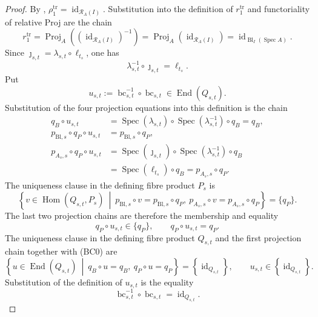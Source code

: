 \begin{proof}
  By ,
  $\rho_1^{\mathrm{tr}}=\operatorname{id}_{\mathcal R_A(I)}$.
  Substitution into the definition of $r_1^{\mathrm{tr}}$ and functoriality
  of relative Proj are the chain
  \[
    r_1^{\mathrm{tr}}
      =\operatorname{Proj}_A
        ((\operatorname{id}_{\mathcal R_A(I)})^{-1})
      =\operatorname{Proj}_A
        (\operatorname{id}_{\mathcal R_A(I)})
      =\operatorname{id}_{\operatorname{Bl}_I(\operatorname{Spec}A)}.
  \]
  Since $\jmath_{s,t}=\lambda_{s,t}\circ\ell_{t_s}$, one has
  \[
    \lambda_{s,t}^{-1}\circ\jmath_{s,t}=\ell_{t_s}.
  \]
  Put
  \[
    u_{s,t}:=
      \operatorname{bc}_{s,t}^{-1}\circ\operatorname{bc}_{s,t}
      \in\operatorname{End}(Q_{s,t}).
  \]
  Substitution of the four projection equations into this definition is the
  chain
  \[
  \begin{aligned}
    q_B\circ u_{s,t}
      &=\operatorname{Spec}(\lambda_{s,t})\circ
        \operatorname{Spec}(\lambda_{s,t}^{-1})\circ q_B=q_B,\\
    p_{\mathrm{Bl},s}\circ q_P\circ u_{s,t}
      &=p_{\mathrm{Bl},s}\circ q_P,\\
    p_{A_s,s}\circ q_P\circ u_{s,t}
      &=\operatorname{Spec}(\jmath_{s,t})\circ
        \operatorname{Spec}(\lambda_{s,t}^{-1})\circ q_B\\
      &=\operatorname{Spec}(\ell_{t_s})\circ q_B
       =p_{A_s,s}\circ q_P.
  \end{aligned}
  \]
  The uniqueness clause in the defining fibre product $P_s$ is
  \[
    \left\{v\in\operatorname{Hom}(Q_{s,t},P_s)\ \middle|\
      p_{\mathrm{Bl},s}\circ v=p_{\mathrm{Bl},s}\circ q_P,\
      p_{A_s,s}\circ v=p_{A_s,s}\circ q_P\right\}
      =\{q_P\}.
  \]
  The last two projection chains are therefore the membership and equality
  \[
    q_P\circ u_{s,t}\in\{q_P\},\qquad
    q_P\circ u_{s,t}=q_P.                                       \tag{BC0}
  \]
  The uniqueness clause in the defining fibre product $Q_{s,t}$ and the first
  projection chain together with (BC0) are
  \[
    \left\{u\in\operatorname{End}(Q_{s,t})\ \middle|\
      q_B\circ u=q_B,\ q_P\circ u=q_P\right\}
      =\left\{\operatorname{id}_{Q_{s,t}}\right\},\qquad
    u_{s,t}\in\left\{\operatorname{id}_{Q_{s,t}}\right\}.
  \]
  Substitution of the definition of $u_{s,t}$ is the equality
  \[
    \operatorname{bc}_{s,t}^{-1}\circ\operatorname{bc}_{s,t}
      =\operatorname{id}_{Q_{s,t}}.                              \tag{BC1}
\]
\end{proof}
